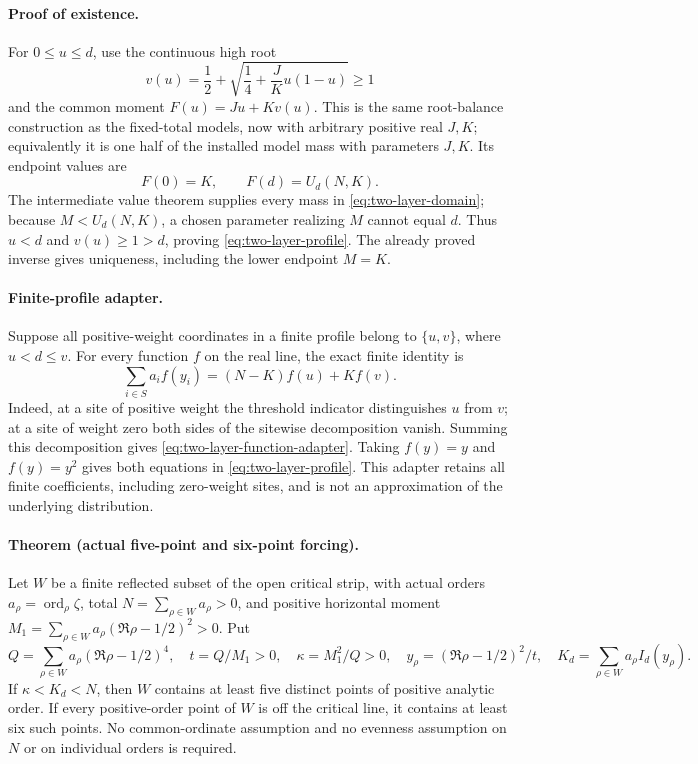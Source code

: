 \paragraph{Proof of existence.}
For \(0\le u\le d\), use the continuous high root
\[
 v(u)=\frac12+\sqrt{\frac14+\frac JK u(1-u)}\ge1
\]
and the common moment \(F(u)=Ju+Kv(u)\).  This is the same
root-balance construction as the fixed-total models, now with arbitrary
positive real \(J,K\); equivalently it is one half of the installed
model mass with parameters \(J,K\).  Its endpoint values are
\[
 F(0)=K,\qquad F(d)=U_d(N,K).
\]
The intermediate value theorem supplies every mass in
\eqref{eq:two-layer-domain}; because \(M<U_d(N,K)\), a chosen
parameter realizing \(M\) cannot equal \(d\).  Thus \(u<d\)
and \(v(u)\ge1>d\), proving \eqref{eq:two-layer-profile}.
The already proved inverse gives uniqueness, including the lower endpoint
\(M=K\).

\paragraph{Finite-profile adapter.}
Suppose all positive-weight coordinates in a finite profile belong to
\(\{u,v\}\), where \(u<d\le v\).  For every function \(f\)
on the real line, the exact finite identity is
\begin{equation}
 \sum_{i\in S}a_i f(y_i)=(N-K)f(u)+Kf(v).
 \label{eq:two-layer-function-adapter}
\end{equation}
Indeed, at a site of positive weight the threshold indicator distinguishes
\(u\) from \(v\); at a site of weight zero both sides of the
sitewise decomposition vanish.  Summing this decomposition gives
\eqref{eq:two-layer-function-adapter}.  Taking \(f(y)=y\) and
\(f(y)=y^2\) gives both equations in \eqref{eq:two-layer-profile}.
This adapter retains all finite coefficients, including zero-weight sites,
and is not an approximation of the underlying distribution.

\paragraph{Theorem (actual five-point and six-point forcing).}
Let \(W\) be a finite reflected subset of the open critical strip, with
actual orders \(a_\rho=\operatorname{ord}_\rho\zeta\), total
\(N=\sum_{\rho\in W}a_\rho>0\), and positive horizontal moment
\(M_1=\sum_{\rho\in W}a_\rho(\Re\rho-1/2)^2>0\).
Put
\[
 Q=\sum_{\rho\in W}a_\rho(\Re\rho-1/2)^4,\quad
 t=Q/M_1>0,\quad \kappa=M_1^2/Q>0,\quad
 y_\rho=(\Re\rho-1/2)^2/t,\quad
 K_d=\sum_{\rho\in W}a_\rho I_d(y_\rho).
\]
If \(\kappa<K_d<N\), then \(W\) contains at least five distinct
points of positive analytic order.  If every positive-order point of
\(W\) is off the critical line, it contains at least six such points.
No common-ordinate assumption and no evenness assumption on \(N\) or
on individual orders is required.

